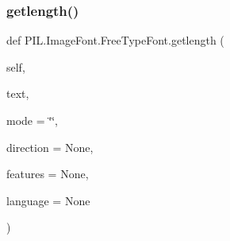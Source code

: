 \subsubsection{\texorpdfstring{getlength()}{getlength()}}
{\footnotesize\ttfamily def P\+I\+L.\+Image\+Font.\+Free\+Type\+Font.\+getlength (\begin{DoxyParamCaption}\item[{}]{self,  }\item[{}]{text,  }\item[{}]{mode = {\ttfamily \char`\"{}\char`\"{}},  }\item[{}]{direction = {\ttfamily None},  }\item[{}]{features = {\ttfamily None},  }\item[{}]{language = {\ttfamily None} }\end{DoxyParamCaption})}

